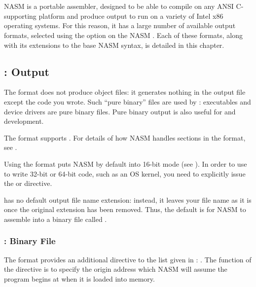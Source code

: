 \chapter{}
\label{ch:outfmt}

NASM is a portable assembler, designed to be able to compile on any
ANSI C-supporting platform and produce output to run on a variety of
Intel x86 operating systems. For this reason, it has a large number
of available output formats, selected using the  option
on the NASM . Each of these formats, along with
its extensions to the base NASM syntax, is detailed in this chapter.

\section{:  Output}
\label{sec:binfmt}

The  format does not produce object files: it generates
nothing in the output file except the code you wrote. Such ``pure
binary'' files are used by : 
executables and  device drivers are pure binary
files. Pure binary output is also useful for 
and  development.

The  format supports .
For details of how NASM handles sections in the  format,
see .

Using the  format puts NASM by default into 16-bit mode
(see ). In order to use  to write 32-bit
or 64-bit code, such as an OS kernel, you need to explicitly issue
the  or 
directive.

 has no default output file name extension: instead, it
leaves your file name as it is once the original extension has been
removed. Thus, the default is for NASM to assemble 
into a binary file called .

\subsection{: Binary File }
\label{subsec:binfmt}

The  format provides an additional directive to the list
given in : . The function of the
 directive is to specify the origin address which NASM
will assume the program begins at when it is loaded into memory.

